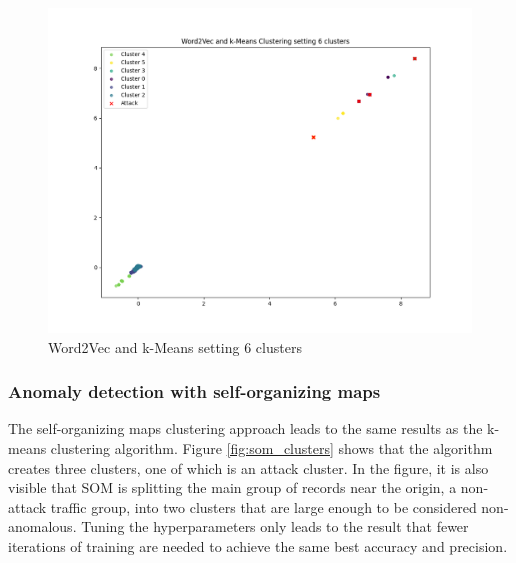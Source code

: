 \documentclass[
    fontsize=12pt,
    headings=small,
    parskip=half,           %
    bibliography=totoc,
    numbers=noenddot,       %
    open=any,               %
    ]{scrreprt}
\begin{document}
\begin{figure}[H]
	\caption{Word2Vec and k-Means setting 6 clusters}
	\label{fig:kmeans_clusters_6}
	\sffamily\footnotesize
	\includegraphics[width=1\textwidth]{pic/k_means_6.png}
	\unitlength=0.75mm
	\linethickness{0.4pt}
\end{figure}

\subsubsection{Anomaly detection with self-organizing maps}
The self-organizing maps clustering approach leads to the same results as the k-means clustering algorithm. Figure \ref{fig:som_clusters} shows that the algorithm creates three clusters, one of which is an attack cluster. In the figure, it is also visible that SOM is splitting the main group of records near the origin, a non-attack traffic group, into two clusters that are large enough to be considered non-anomalous. Tuning the hyperparameters only leads to the result that fewer iterations of training are needed to achieve the same best accuracy and precision. 
\end{document}
